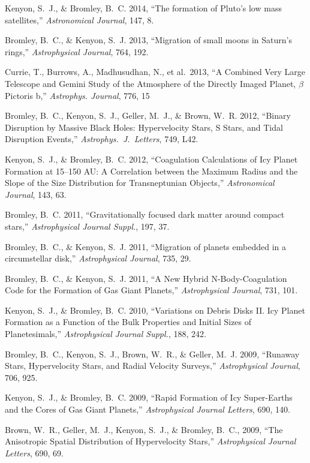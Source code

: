 \documentclass[11pt]{article}
\def\refitem{} %
\begin{document}
\refitem Kenyon, S.~J., \& Bromley, B.~C. 2014, ``The formation of
Pluto's low mass satellites,'' {\em Astronomical Journal}, 147, 8.

\refitem Bromley, B.~C., \& Kenyon, S.~J. 2013, ``Migration of small
moons in Saturn's rings,'' {\em Astrophysical Journal}, 764, 192.

\refitem Currie, T., Burrows, A., Madhusudhan, N., et al.\ 2013, ``A
Combined Very Large Telescope and Gemini Study of the Atmosphere of
the Directly Imaged Planet, $\beta$ Pictoris b,'' {\em
  Astrophys. Journal}, 776, 15

\refitem Bromley, B.~C., Kenyon, S.~J., Geller, M.~J., \& Brown, W.~R.
2012, ``Binary Disruption by Massive Black Holes: Hypervelocity Stars,
S Stars, and Tidal Disruption Events,''
{\em Astrophys.~J.~Letters},
749, L42.


\refitem Kenyon, S.~J., \& Bromley, B.~C. 2012, ``Coagulation
Calculations of Icy Planet Formation at 15--150 AU: A Correlation
between the Maximum Radius and the Slope of the Size Distribution for
Transneptunian Objects,'' {\em Astronomical Journal}, 143, 63.

\refitem Bromley, B.~C. 2011, ``Gravitationally focused dark matter
around compact stars,'' {\em Astrophysical Journal Suppl.}, 197, 37.

\refitem Bromley, B.~C., \& Kenyon, S.~J. 2011, ``Migration of planets
embedded in a circumstellar disk,'' {\em Astrophysical Journal}, 735,
29.

\refitem Bromley, B.~C., \& Kenyon, S.~J. 2011, ``A New Hybrid
N-Body-Coagulation Code for the Formation of Gas Giant Planets,'' {\em
  Astrophysical Journal}, 731, 101.

\refitem Kenyon, S.~J., \& Bromley, B.~C. 2010, ``Variations on Debris
Disks II. Icy Planet Formation as a Function of the Bulk Properties
and Initial Sizes of Planetesimals,'' {\em Astrophysical Journal
  Suppl.}, 188, 242.


\refitem Bromley, B.~C., Kenyon, S.~J., Brown, W.~R., \& Geller,
M.~J. 2009, ``Runaway Stars, Hypervelocity Stars, and Radial Velocity
Surveys,'' {\em Astrophysical Journal}, 706, 925.


\refitem Kenyon, S.~J., \& Bromley, B.~C. 2009, ``Rapid Formation of
Icy Super-Earths and the Cores of Gas Giant Planets,'' {\em
  Astrophysical Journal Letters}, 690, 140.



\refitem Brown, W.~R., Geller, M.~J., Kenyon, S.~J., \& Bromley,
B.~C., 2009, ``The Anisotropic Spatial Distribution of Hypervelocity
Stars,'' {\em Astrophysical Journal Letters}, 690, 69.
\end{document}
